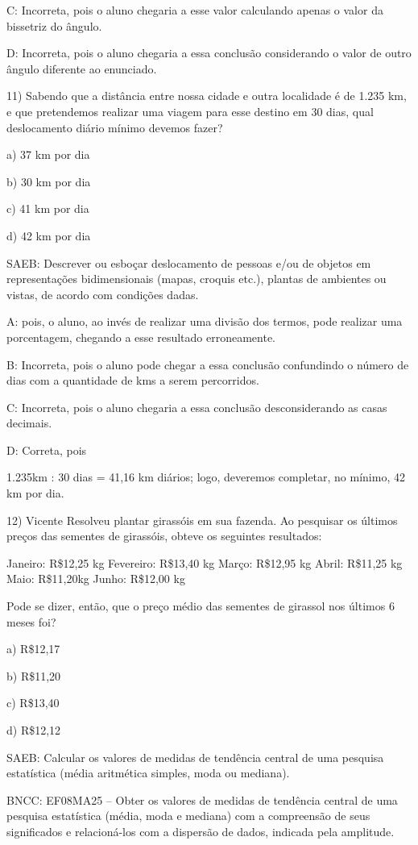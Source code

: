 C: Incorreta, pois o aluno chegaria a esse valor calculando apenas o
valor da bissetriz do ângulo.

D: Incorreta, pois o aluno chegaria a essa conclusão considerando o
valor de outro ângulo diferente ao enunciado.

11) Sabendo que a distância entre nossa cidade e outra localidade é de
1.235 km, e que pretendemos realizar uma viagem para esse destino em 30
dias, qual deslocamento diário mínimo devemos fazer?

a) 37 km por dia

b) 30 km por dia

c) 41 km por dia

d) 42 km por dia

SAEB: Descrever ou esboçar deslocamento de pessoas e/ou de objetos em
representações bidimensionais (mapas, croquis etc.), plantas de
ambientes ou vistas, de acordo com condições dadas.

A: pois, o aluno, ao invés de realizar uma divisão dos termos, pode
realizar uma porcentagem, chegando a esse resultado erroneamente.

B: Incorreta, pois o aluno pode chegar a essa conclusão confundindo o
número de dias com a quantidade de kms a serem percorridos.

C: Incorreta, pois o aluno chegaria a essa conclusão desconsiderando as
casas decimais.

D: Correta, pois

1.235km : 30 dias = 41,16 km diários; logo, deveremos completar, no
mínimo, 42 km por dia.

12) Vicente Resolveu plantar girassóis em sua fazenda. Ao pesquisar os
últimos preços das sementes de girassóis, obteve os seguintes
resultados:

Janeiro: R\$12,25 kg Fevereiro: R\$13,40 kg Março: R\$12,95 kg Abril:
R\$11,25 kg Maio: R\$11,20kg Junho: R\$12,00 kg

Pode se dizer, então, que o preço médio das sementes de girassol nos
últimos 6 meses foi?

a) R\$12,17

b) R\$11,20

c) R\$13,40

d) R\$12,12

SAEB: Calcular os valores de medidas de tendência central de uma
pesquisa estatística (média aritmética simples, moda ou mediana).

BNCC: EF08MA25 -- Obter os valores de medidas de tendência central de
uma pesquisa estatística (média, moda e mediana) com a compreensão de
seus significados e relacioná-los com a dispersão de dados, indicada
pela amplitude.

